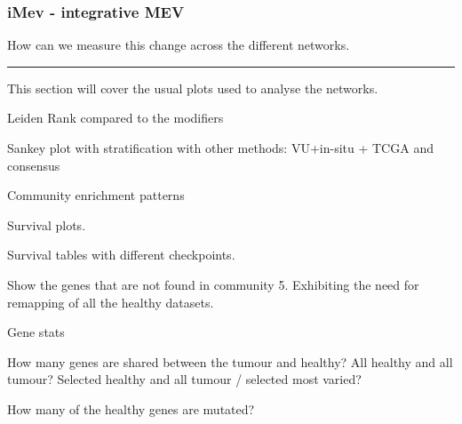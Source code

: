 

\subsubsection{iMev - integrative MEV}



How can we measure this change across the different networks.

\par\noindent\rule{\textwidth}{0.4pt}


This section will cover the usual plots used to analyse the networks.
\begin{todolist}
    \item[\done] Leiden Rank compared to the modifiers
    \item[\done] Sankey plot with stratification with other methods: VU+in-situ + TCGA and consensus
    \item[\done] Community enrichment patterns
    \item [\done] Survival plots.
    \item Survival tables with different checkpoints.
    \item Show the genes that are not found in community 5. Exhibiting the need for remapping of all the healthy datasets.
    \item Gene stats 
    \begin{todolist}
        \item How many genes are shared between the tumour and healthy? All healthy and all tumour? Selected healthy and all tumour / selected most varied?
        \item How many of the healthy genes are mutated?
    \end{todolist}
\end{todolist}
